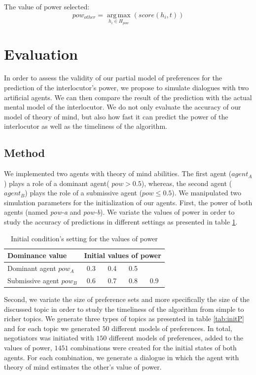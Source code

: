 \documentclass[conference, letterpaper]{IEEEtran}
\begin{document}
	The value of power selected:
	\begin{equation}
	pow_{other} = \operatorname*{arg\,max}_{h_i \in H_{pow}} ( score(h_i,t))
	\end{equation}
	
	
	\section{Evaluation}
	In order to assess the validity of our partial model of preferences for the prediction of the interlocutor's power, we propose to simulate dialogues with two artificial agents. We can then compare the result of the prediction with the actual mental model of the interlocutor. We do not only evaluate the accuracy of our model of theory of mind, but also how fast it can predict the power of the interlocutor as well as the timeliness of the algorithm.
	
	\subsection{Method}
	We implemented two agents with theory of mind abilities.
	The first agent ($agent_A$) plays a role of a dominant agent( $pow > 0.5$), whereas, the second agent ($agent_B$) plays the role of a submissive agent ($pow \leq 0.5$). 
	We manipulated two simulation parameters for the initialization of our agents. First, the power of both agents (named \emph{pow-a} and \emph{pow-b}). We variate the values of power in order to study the accuracy of predictions in different settings as presented in table \ref{tab:powsettings}.
	\begin{table}[t]
		\centering
		\caption{Initial condition's setting for the values of power} 
		\begin{tabular}{|l|cccc|}
			\hline 
			\textbf{Dominance value } &	\multicolumn{4}{c|}{ Initial values of power } \\
			\hline
			Dominant agent $pow_A$ & 0.3 & 0.4 & 0.5 &  \\
			\hline
			Submissive agent $pow_B$ & 0.6 & 0.7 & 0.8 & 0.9\\
			\hline
		\end{tabular}
		
		\label{tab:powsettings}
	\end{table}
	
	Second, we variate the size of preference sets and more specifically the size of the discussed topic in order to study the timeliness of the algorithm from simple to richer topics. We generate three types of topics as presented in table \ref{tab:initP} and for each topic we generated $50$ different models of preferences. In total, negotiators was initiated with $150$ different models of preferences, added to the values of power,  $1451$ combinations were created for the initial states of both agents. For each combination, we generate a dialogue in which the agent with theory of mind estimates the other's value of power.
	
\end{document}
